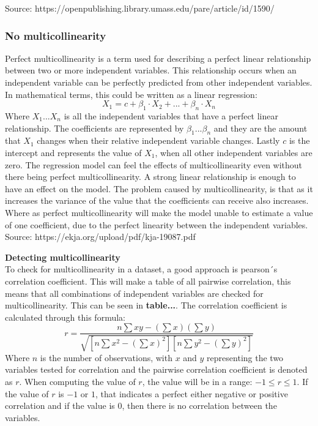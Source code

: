 Source: https://openpublishing.library.umass.edu/pare/article/id/1590/

\subsubsection{No multicollinearity}
Perfect multicollinearity is a term used for describing a perfect linear relationship between two or more independent variables. This relationship occurs when an independent variable can be perfectly predicted from other independent variables. In mathematical terms, this could be written as a linear regression:
$$
X_1 = c+\beta_1\cdot X_2+...+\beta_n\cdot X_n
$$ 
Where $X_1...X_n$ is all the independent variables that have a perfect linear relationship. The coefficients are represented by $\beta_1...\beta_n$ and they are the amount that $X_1$ changes when their relative independent variable changes.
Lastly $c$ is the intercept and represents the value of $X_1$, when all other independent variables are zero.
\newline
The regression model can feel the effects of multicollinearity even without there being perfect multicollinearity. A strong linear relationship is enough to have an effect on the model. The problem caused by multicollinearity, is that as it increases the variance of the value that the coefficients can receive also increases. Where as perfect multicollinearity will make the model unable to estimate a value of one coefficient, due to the perfect linearity between the independent variables.
\newline
Source: https://ekja.org/upload/pdf/kja-19087.pdf

\textbf{Detecting multicollinearity}\\
To check for multicollinearity in a dataset, a good approach is pearson´s correlation coefficient. This will make a table of all pairwise correlation, this means that all combinations of independent variables are checked for multicollinearity. This can be seen in \textbf{table...}. The correlation coefficient is calculated through this formula:
$$
r = \frac{n \sum xy - (\sum x)(\sum y)}{\sqrt{[n \sum x^2 - (\sum x)^2][n \sum y^2 - (\sum y)^2]}}
$$
Where $n$ is the number of observations, with $x$ and $y$ representing the two variables tested for correlation and the pairwise correlation coefficient is denoted as $r$. When computing the value of $r$, the value will be in a range: $-1\leq r \leq 1$. If the value of $r$ is $-1$ or $1$, that indicates a perfect either negative or positive correlation and if the value is $0$, then there is no correlation between the variables.






